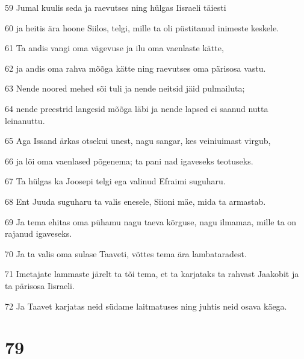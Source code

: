 \par 59 Jumal kuulis seda ja raevutses ning hülgas Iisraeli täiesti
\par 60 ja heitis ära hoone Siilos, telgi, mille ta oli püstitanud inimeste keskele.
\par 61 Ta andis vangi oma vägevuse ja ilu oma vaenlaste kätte,
\par 62 ja andis oma rahva mõõga kätte ning raevutses oma pärisosa vastu.
\par 63 Nende noored mehed sõi tuli ja nende neitsid jäid pulmailuta;
\par 64 nende preestrid langesid mõõga läbi ja nende lapsed ei saanud nutta leinanuttu.
\par 65 Aga Issand ärkas otsekui unest, nagu sangar, kes veiniuimast virgub,
\par 66 ja lõi oma vaenlased põgenema; ta pani nad igaveseks teotuseks.
\par 67 Ta hülgas ka Joosepi telgi ega valinud Efraimi suguharu.
\par 68 Ent Juuda suguharu ta valis enesele, Siioni mäe, mida ta armastab.
\par 69 Ja tema ehitas oma pühamu nagu taeva kõrguse, nagu ilmamaa, mille ta on rajanud igaveseks.
\par 70 Ja ta valis oma sulase Taaveti, võttes tema ära lambataradest.
\par 71 Imetajate lammaste järelt ta tõi tema, et ta karjataks ta rahvast Jaakobit ja ta pärisosa Iisraeli.
\par 72 Ja Taavet karjatas neid südame laitmatuses ning juhtis neid osava käega.

\chapter{79}

